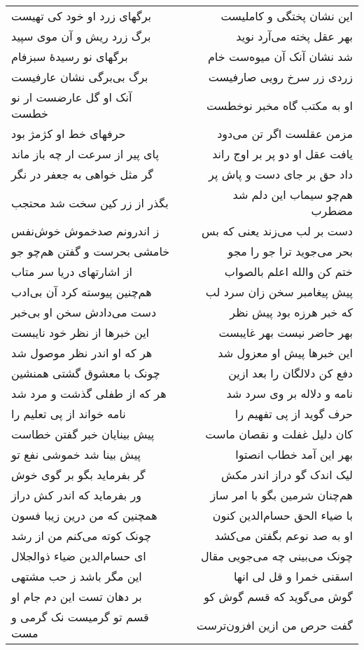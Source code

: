 \begin{center}
\begin{longtable}{l p{0.5cm} r}
برگهای زرد او خود کی تهیست
&&
این نشان پختگی و کاملیست
\\
برگ زرد ریش و آن موی سپید
&&
بهر عقل پخته می‌آرد نوید
\\
برگهای نو رسیدهٔ سبزفام
&&
شد نشان آنک آن میوه‌ست خام
\\
برگ بی‌برگی نشان عارفیست
&&
زردی زر سرخ رویی صارفیست
\\
آنک او گل عارضست ار نو خطست
&&
او به مکتب گاه مخبر نوخطست
\\
حرفهای خط او کژمژ بود
&&
مزمن عقلست اگر تن می‌دود
\\
پای پیر از سرعت ار چه باز ماند
&&
یافت عقل او دو پر بر اوج راند
\\
گر مثل خواهی به جعفر در نگر
&&
داد حق بر جای دست و پاش پر
\\
بگذر از زر کین سخت شد محتجب
&&
هم‌چو سیماب این دلم شد مضطرب
\\
ز اندرونم صدخموش خوش‌نفس
&&
دست بر لب می‌زند یعنی که بس
\\
خامشی بحرست و گفتن هم‌چو جو
&&
بحر می‌جوید ترا جو را مجو
\\
از اشارتهای دریا سر متاب
&&
ختم کن والله اعلم بالصواب
\\
هم‌چنین پیوسته کرد آن بی‌ادب
&&
پیش پیغامبر سخن زان سرد لب
\\
دست می‌دادش سخن او بی‌خبر
&&
که خبر هرزه بود پیش نظر
\\
این خبرها از نظر خود نایبست
&&
بهر حاضر نیست بهر غایبست
\\
هر که او اندر نظر موصول شد
&&
این خبرها پیش او معزول شد
\\
چونک با معشوق گشتی همنشین
&&
دفع کن دلالگان را بعد ازین
\\
هر که از طفلی گذشت و مرد شد
&&
نامه و دلاله بر وی سرد شد
\\
نامه خواند از پی تعلیم را
&&
حرف گوید از پی تفهیم را
\\
پیش بینایان خبر گفتن خطاست
&&
کان دلیل غفلت و نقصان ماست
\\
پیش بینا شد خموشی نفع تو
&&
بهر این آمد خطاب انصتوا
\\
گر بفرماید بگو بر گوی خوش
&&
لیک اندک گو دراز اندر مکش
\\
ور بفرماید که اندر کش دراز
&&
هم‌چنان شرمین بگو با امر ساز
\\
همچنین که من درین زیبا فسون
&&
با ضیاء الحق حسام‌الدین کنون
\\
چونک کوته می‌کنم من از رشد
&&
او به صد نوعم بگفتن می‌کشد
\\
ای حسام‌الدین ضیاء ذوالجلال
&&
چونک می‌بینی چه می‌جویی مقال
\\
این مگر باشد ز حب مشتهی
&&
اسقنی خمرا و قل لی انها
\\
بر دهان تست این دم جام او
&&
گوش می‌گوید که قسم گوش کو
\\
قسم تو گرمیست نک گرمی و مست
&&
گفت حرص من ازین افزون‌ترست
\\
\end{longtable}
\end{center}
